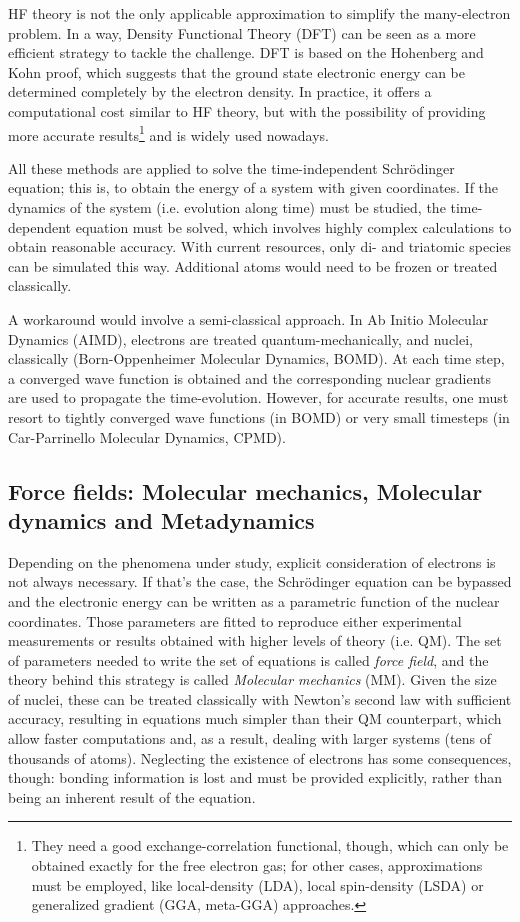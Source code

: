 HF theory is not the only applicable approximation to simplify the many-electron problem. In a way, Density Functional Theory (DFT) can be seen as a more efficient strategy to tackle the challenge. DFT is based on the Hohenberg and Kohn proof, which suggests that the ground state electronic energy can be determined completely by the electron density. In practice, it offers a computational cost similar to HF theory, but with the possibility of providing more accurate results\footnote{They need a good exchange-correlation functional, though, which can only be obtained exactly for the free electron gas; for other cases, approximations must be employed, like local-density (LDA), local spin-density (LSDA) or generalized gradient (GGA, meta-GGA) approaches.} and is widely used nowadays.

All these methods are applied to solve the time-independent Schrödinger equation; this is, to obtain the energy of a system with given coordinates. If the dynamics of the system (i.e. evolution along time) must be studied, the time-dependent equation must be solved, which involves highly complex calculations to obtain reasonable accuracy. With current resources, only di- and triatomic species can be simulated this way. Additional atoms would need to be frozen or treated classically.

A workaround would involve a semi-classical approach. In Ab Initio Molecular Dynamics (AIMD), electrons are treated quantum-mechanically, and nuclei, classically (Born-Oppenheimer Molecular Dynamics, BOMD). At each time step, a converged wave function is obtained and the corresponding nuclear gradients are used to propagate the time-evolution. However, for accurate results, one must resort to tightly converged wave functions (in BOMD) or very small timesteps (in Car-Parrinello Molecular Dynamics, CPMD).

\subsection{Force fields: Molecular mechanics, Molecular dynamics and Metadynamics}
\label{section:mm-md}
Depending on the phenomena under study, explicit consideration of electrons is not always necessary. If that's the case, the Schrödinger equation can be bypassed and the electronic energy can be written as a parametric function of the nuclear coordinates. Those parameters are fitted to reproduce either experimental measurements or results obtained with higher levels of theory (i.e. QM). The set of parameters needed to write the set of equations is called \textit{force field}, and the theory behind this strategy is called \textit{Molecular mechanics} (MM). Given the size of nuclei, these can be treated classically with Newton's second law with sufficient accuracy, resulting in equations much simpler than their QM counterpart, which allow faster computations and, as a result, dealing with larger systems (tens of thousands of atoms). Neglecting the existence of electrons has some consequences, though: bonding information is lost and must be provided explicitly, rather than being an inherent result of the equation.


